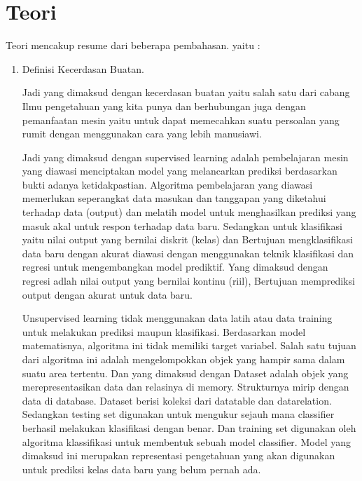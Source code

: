 \section{Teori}
Teori mencakup resume dari beberapa pembahasan. yaitu :
\begin{enumerate}
\item Definisi Kecerdasan Buatan.
\par Jadi yang dimaksud dengan  kecerdasan buatan yaitu  salah satu dari cabang Ilmu pengetahuan yang kita punya dan  berhubungan juga dengan pemanfaatan mesin yaitu untuk dapat memecahkan suatu  persoalan yang rumit dengan  menggunakan cara yang lebih manusiawi.
\par Jadi yang dimaksud dengan supervised learning  adalah pembelajaran mesin yang diawasi menciptakan model yang melancarkan prediksi berdasarkan bukti adanya ketidakpastian. Algoritma pembelajaran yang diawasi memerlukan seperangkat data masukan dan tanggapan yang diketahui terhadap data (output) dan melatih model untuk menghasilkan prediksi yang masuk akal untuk respon terhadap data baru. Sedangkan untuk klasifikasi yaitu nilai output yang  bernilai diskrit (kelas) dan Bertujuan mengklasifikasi data baru dengan akurat diawasi dengan menggunakan teknik klasifikasi dan regresi untuk mengembangkan model prediktif. Yang dimaksud dengan regresi adlah nilai output yang bernilai kontinu (riil), Bertujuan memprediksi output dengan akurat untuk data baru.
\par Unsupervised learning tidak menggunakan data latih atau data training untuk melakukan prediksi maupun klasifikasi. Berdasarkan model matematisnya, algoritma ini tidak memiliki target variabel. Salah satu tujuan dari algoritma ini adalah mengelompokkan objek yang hampir sama dalam suatu area tertentu. Dan yang dimaksud dengan  Dataset adalah objek yang merepresentasikan data dan relasinya di memory. Strukturnya mirip dengan data di database. Dataset berisi koleksi dari datatable dan datarelation. Sedangkan testing set digunakan untuk mengukur sejauh mana classifier berhasil melakukan klasifikasi dengan benar. Dan training set digunakan oleh algoritma klassifikasi untuk membentuk sebuah model classifier. Model yang dimaksud ini merupakan representasi pengetahuan yang akan digunakan untuk prediksi kelas data baru yang belum pernah ada.
\end{enumerate} 

